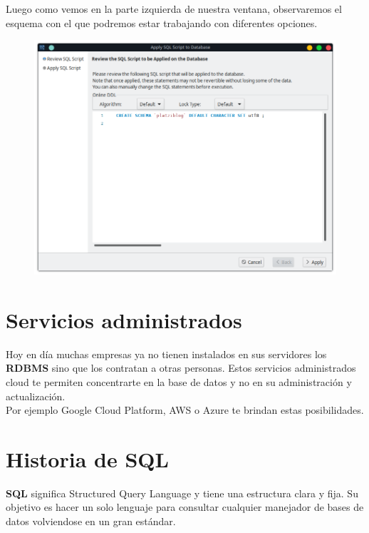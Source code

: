 \documentclass{article}
\begin{document}
\newpage

Luego como vemos en la parte izquierda de nuestra ventana, observaremos el
esquema con el que podremos estar trabajando con diferentes opciones.

\begin{figure}[h!]
  \centering
  \includegraphics[scale=0.65]{./Pictures/042_create_schema.png}
\end{figure}


\section{Servicios administrados}%
Hoy en día muchas empresas ya no tienen instalados en sus servidores los
\textbf{RDBMS} sino que los contratan a otras personas. Estos servicios
administrados cloud te permiten concentrarte en la base de datos y no en su
administración y actualización.\\

Por ejemplo Google Cloud Platform, AWS o Azure te brindan estas posibilidades.

\newpage

\section{Historia de SQL}%
\textbf{SQL} significa Structured Query Language y tiene una estructura clara y
fija. Su objetivo es hacer un solo lenguaje para consultar cualquier manejador
de bases de datos volviendose en un gran estándar.\\
\end{document}
